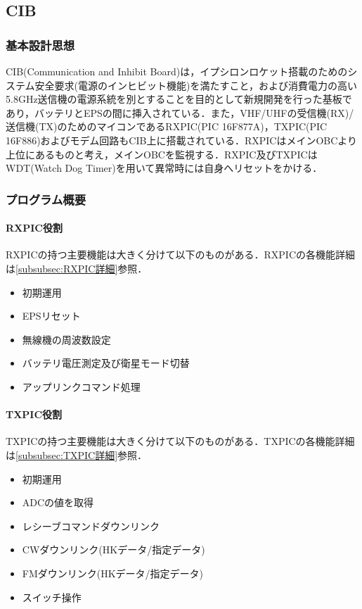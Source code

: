 
\subsection{CIB}
\subsubsection{基本設計思想}
CIB(Communication and Inhibit Board)は，イプシロンロケット搭載のためのシステム安全要求(電源のインヒビット機能)を満たすこと，および消費電力の高い5.8GHz送信機の電源系統を別とすることを目的として新規開発を行った基板であり，バッテリとEPSの間に挿入されている．また，VHF/UHFの受信機(RX)/送信機(TX)のためのマイコンであるRXPIC(PIC 16F877A)，TXPIC(PIC 16F886)およびモデム回路もCIB上に搭載されている．RXPICはメインOBCより上位にあるものと考え，メインOBCを監視する．RXPIC及びTXPICはWDT(Watch Dog Timer)を用いて異常時には自身へリセットをかける．

\subsubsection{プログラム概要}
\paragraph{RXPIC役割}\label{par:RXPIC役割}
RXPICの持つ主要機能は大きく分けて以下のものがある．RXPICの各機能詳細は\ref{subsubsec:RXPIC詳細}参照．
\begin{itemize}
	\item 初期運用
	\item EPSリセット
	\item 無線機の周波数設定
	\item バッテリ電圧測定及び衛星モード切替
	\item アップリンクコマンド処理
\end{itemize}

\paragraph{TXPIC役割}\label{par:TXPIC役割}
TXPICの持つ主要機能は大きく分けて以下のものがある．TXPICの各機能詳細は\ref{subsubsec:TXPIC詳細}参照．
\begin{itemize}
	\item 初期運用
	\item ADCの値を取得
	\item レシーブコマンドダウンリンク
	\item CWダウンリンク(HKデータ/指定データ)
	\item FMダウンリンク(HKデータ/指定データ)
	\item スイッチ操作
\end{itemize}

